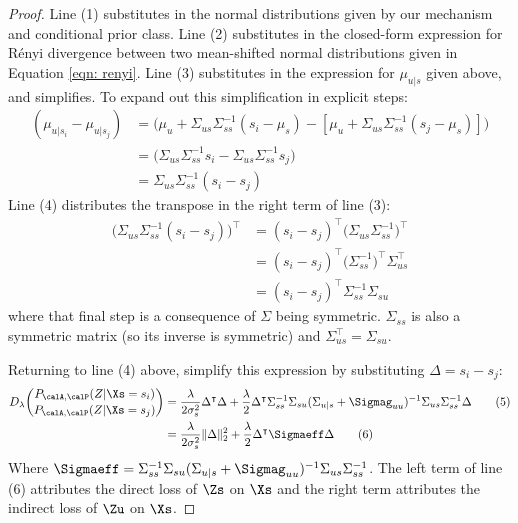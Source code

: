 \begin{proof}
Line (1) substitutes in the normal distributions given by our mechanism and conditional prior class. Line (2) substitutes in the closed-form expression for R\'enyi divergence between two mean-shifted normal distributions given in Equation \ref{eqn: renyi}. Line (3) substitutes in the expression for $\mu_{u|s}$ given above, and simplifies. To expand out this simplification in explicit steps: 
\begin{align*}
	(\mu_{u|s_i} - \mu_{u|s_j})
	&= \big(  \mu_u + \Sigma_{us} \Sigma_{ss}^{-1} (s_i - \mu_s) -  [\mu_u + \Sigma_{us} \Sigma_{ss}^{-1} (s_j - \mu_s)] \big) \\
	&= \big(  \Sigma_{us} \Sigma_{ss}^{-1} s_i -  \Sigma_{us} \Sigma_{ss}^{-1} s_j \big) \\
	&= \Sigma_{us} \Sigma_{ss}^{-1} (s_i - s_j)
\end{align*}
Line (4) distributes the transpose in the right term of line (3): 
\begin{align*}
	\big( \Sigma_{us} \Sigma_{ss}^{-1}(s_i - s_j) \big)^\intercal
	&= (s_i - s_j)^\intercal \big(  \Sigma_{us} \Sigma_{ss}^{-1} \big)^\intercal \\
	&=  (s_i - s_j)^\intercal  \big( \Sigma_{ss}^{-1} \big)^\intercal \Sigma_{us}^\intercal   \\
	&= (s_i - s_j)^\intercal \Sigma_{ss}^{-1}  \Sigma_{su}
\end{align*}
where that final step is a consequence of $\Sigma$ being symmetric. $\Sigma_{ss}$ is also a symmetric matrix (so its inverse is symmetric) and $\Sigma_{us}^\intercal = \Sigma_{su}$. 

Returning to line (4) above, simplify this expression by substituting $\Delta = s_i - s_j$: 
\begin{align}
	D_\lambda \binom{P_{\calA, \calP}(Z | \Xs = s_i)}{P_{\calA, \calP}(Z | \Xs = s_j)}
	&= \frac{\lambda}{2 \sigma_s^2}   \Delta^\intercal \Delta 
	+  \frac{\lambda}{2} \Delta^\intercal \Sigma_{ss}^{-1} \Sigma_{su}  (\Sigma_{u|s} + \Sigmag_{uu})^{-1} \Sigma_{us} \Sigma_{ss}^{-1} \Delta \tag{5} \\
	&= \frac{\lambda}{2 \sigma_s^2}  \| \Delta \|_2^2 
	+  \frac{\lambda}{2} \Delta^\intercal \Sigmaeff \Delta \tag{6} 
\end{align}
Where $\Sigmaeff = \Sigma_{ss}^{-1} \Sigma_{su}  (\Sigma_{u|s} + \Sigmag_{uu})^{-1} \Sigma_{us} \Sigma_{ss}^{-1}$. The left term of line (6) attributes the direct loss of $\Zs$ on $\Xs$ and the right term attributes the indirect loss of $\Zu$ on $\Xs$. 


\end{proof}
